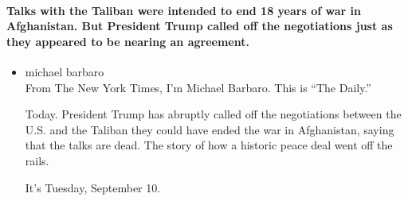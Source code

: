 \hypertarget{talks-with-the-taliban-were-intended-to-end-18-years-of-war-in-afghanistan-but-president-trump-called-off-the-negotiations-just-as-they-appeared-to-be-nearing-an-agreement}{%
\paragraph{Talks with the Taliban were intended to end 18 years of war
in Afghanistan. But President Trump called off the negotiations just as
they appeared to be nearing an
agreement.}\label{talks-with-the-taliban-were-intended-to-end-18-years-of-war-in-afghanistan-but-president-trump-called-off-the-negotiations-just-as-they-appeared-to-be-nearing-an-agreement}}

\begin{itemize}
\item
  michael barbaro\\
  From The New York Times, I'm Michael Barbaro. This is ``The Daily.''

  Today. President Trump has abruptly called off the negotiations
  between the U.S. and the Taliban they could have ended the war in
  Afghanistan, saying that the talks are dead. The story of how a
  historic peace deal went off the rails.

  It's Tuesday, September 10.


\end{itemize}
